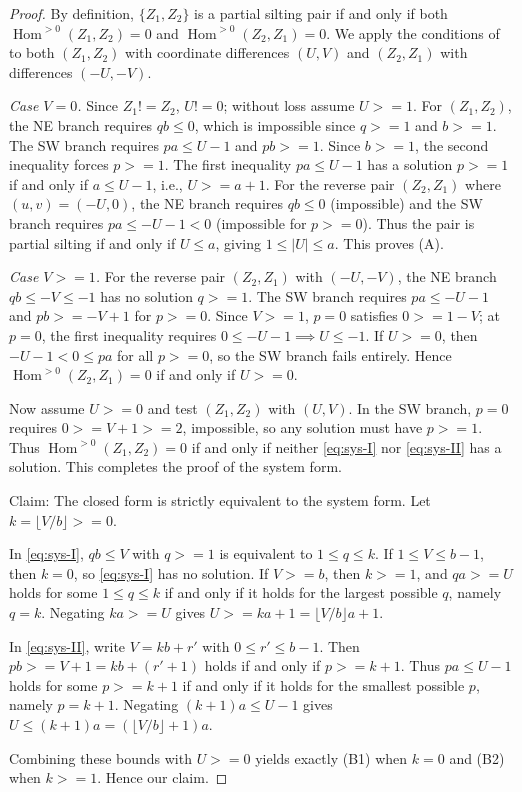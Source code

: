\documentclass[11pt, a4paper]{article}
\theoremstyle{definition}
\def\ge{>=}%
\def\neq{!=}%
\begin{document}
\begin{proof}
By definition, $\{Z_1, Z_2\}$ is a partial silting pair if and only if both $\operatorname{Hom}^{>0}(Z_1, Z_2) = 0$ and $\operatorname{Hom}^{>0}(Z_2, Z_1) = 0$. We apply the conditions of  to both $(Z_1, Z_2)$ with coordinate differences $(U, V)$ and $(Z_2, Z_1)$ with differences $(-U, -V)$.

\emph{Case $V = 0$.} Since $Z_1 \neq Z_2$, $U \neq 0$; without loss assume $U \ge 1$. For $(Z_1, Z_2)$, the NE branch requires $q b \le 0$, which is impossible since $q \ge 1$ and $b \ge 1$. The SW branch requires $p a \le U - 1$ and $p b \ge 1$. Since $b \ge 1$, the second inequality forces $p \ge 1$. The first inequality $p a \le U - 1$ has a solution $p \ge 1$ if and only if $a \le U - 1$, i.e., $U \ge a + 1$. For the reverse pair $(Z_2, Z_1)$ where $(u, v) = (-U, 0)$, the NE branch requires $q b \le 0$ (impossible) and the SW branch requires $p a \le -U - 1 < 0$ (impossible for $p \ge 0$). Thus the pair is partial silting if and only if $U \le a$, giving $1 \le |U| \le a$. This proves (A).

\emph{Case $V \ge 1$.} For the reverse pair $(Z_2, Z_1)$ with $(-U, -V)$, the NE branch $q b \le -V \le -1$ has no solution $q \ge 1$. The SW branch requires $p a \le -U - 1$ and $p b \ge -V + 1$ for $p \ge 0$. Since $V \ge 1$, $p = 0$ satisfies $0 \ge 1 - V$; at $p=0$, the first inequality requires $0 \le -U - 1 \implies U \le -1$. If $U \ge 0$, then $-U - 1 < 0 \le p a$ for all $p \ge 0$, so the SW branch fails entirely. Hence $\operatorname{Hom}^{>0}(Z_2, Z_1) = 0$ if and only if $U \ge 0$.

Now assume $U \ge 0$ and test $(Z_1, Z_2)$ with $(U, V)$. In the SW branch, $p = 0$ requires $0 \ge V + 1 \ge 2$, impossible, so any solution must have $p \ge 1$. Thus $\operatorname{Hom}^{>0}(Z_1, Z_2) = 0$ if and only if neither \eqref{eq:sys-I} nor \eqref{eq:sys-II} has a solution. This completes the proof of the system form.

Claim: The closed form is strictly equivalent to the system form.
Let $k = \lfloor V/b \rfloor \ge 0$.

In \eqref{eq:sys-I}, $q b \le V$ with $q \ge 1$ is equivalent to $1 \le q \le k$. If $1 \le V \le b - 1$, then $k = 0$, so \eqref{eq:sys-I} has no solution. If $V \ge b$, then $k \ge 1$, and $q a \ge U$ holds for some $1 \le q \le k$ if and only if it holds for the largest possible $q$, namely $q = k$. Negating $k a \ge U$ gives $U \ge k a + 1 = \lfloor V/b \rfloor a + 1$.

In \eqref{eq:sys-II}, write $V = k b + r'$ with $0 \le r' \le b - 1$. Then $p b \ge V + 1 = k b + (r' + 1)$ holds if and only if $p \ge k + 1$. Thus $p a \le U - 1$ holds for some $p \ge k + 1$ if and only if it holds for the smallest possible $p$, namely $p = k + 1$. Negating $(k + 1)a \le U - 1$ gives $U \le (k + 1)a = (\lfloor V/b \rfloor + 1)a$.

Combining these bounds with $U \ge 0$ yields exactly (B1) when $k = 0$ and (B2) when $k \ge 1$. Hence our claim.
\end{proof}
\end{document}

